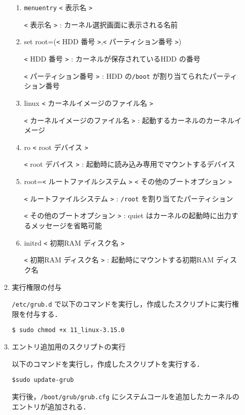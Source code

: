 \documentclass[12pt]{jsarticle}
\begin{document}
\begin{enumerate}
\begin{enumerate}
\begin{enumerate}
\item \verb|menuentry| \verb|<| 表示名 \verb|>|

\verb|<| 表示名 \verb|>| : カーネル選択画面に表示される名前

\item set root=(\verb|<| HDD 番号 \verb|>|,\verb|<| パーティション番号 \verb|>|)

\verb|<| HDD 番号 \verb|>| : カーネルが保存されているHDD の番号

\verb|<| パーティション番号 \verb|>| : HDD の\verb|/boot| が割り当てられたパーティション番号

\item linux \verb|<| カーネルイメージのファイル名 \verb|>|

\verb|<| カーネルイメージのファイル名 \verb|>| : 起動するカーネルのカーネルイメージ

\item ro \verb|<| root デバイス \verb|>|

    \verb|<| root デバイス \verb|>| : 起動時に読み込み専用でマウントするデバイス

\item root=\verb|<| ルートファイルシステム \verb|>| \verb|<| その他のブートオプション \verb|>|

\verb|<| ルートファイルシステム \verb|>| : \verb|/root| を割り当てたパーティション

\verb|<| その他のブートオプション \verb|>| : quiet はカーネルの起動時に出力するメッセージを省略可能

\item initrd \verb|<| 初期RAM ディスク名 \verb|>|

\verb|<| 初期RAM ディスク名 \verb|>| : 起動時にマウントする初期RAM ディスク名

\end{enumerate}

\item 実行権限の付与

\verb|/etc/grub.d| で以下のコマンドを実行し，作成したスクリプトに実行権限を付与する．
\begin{verbatim}
$ sudo chmod +x 11_linux-3.15.0
\end{verbatim}

\item エントリ追加用のスクリプトの実行

以下のコマンドを実行し，作成したスクリプトを実行する．
\begin{verbatim}
$sudo update-grub
\end{verbatim}
実行後，\verb|/boot/grub/grub.cfg| にシステムコールを追加したカーネルのエントリが追加される．


\end{enumerate}
\end{enumerate}
\end{document}

